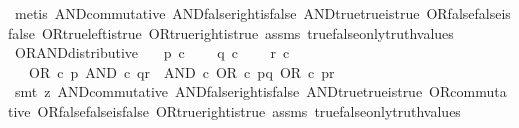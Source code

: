 \begin{isabellebody}
\ {\isacharparenleft}{\kern0pt}metis\ AND{\isacharunderscore}{\kern0pt}commutative\ AND{\isacharunderscore}{\kern0pt}false{\isacharunderscore}{\kern0pt}right{\isacharunderscore}{\kern0pt}is{\isacharunderscore}{\kern0pt}false\ AND{\isacharunderscore}{\kern0pt}true{\isacharunderscore}{\kern0pt}true{\isacharunderscore}{\kern0pt}is{\isacharunderscore}{\kern0pt}true\ OR{\isacharunderscore}{\kern0pt}false{\isacharunderscore}{\kern0pt}false{\isacharunderscore}{\kern0pt}is{\isacharunderscore}{\kern0pt}false\ OR{\isacharunderscore}{\kern0pt}true{\isacharunderscore}{\kern0pt}left{\isacharunderscore}{\kern0pt}is{\isacharunderscore}{\kern0pt}true\ OR{\isacharunderscore}{\kern0pt}true{\isacharunderscore}{\kern0pt}right{\isacharunderscore}{\kern0pt}is{\isacharunderscore}{\kern0pt}true\ assms\ true{\isacharunderscore}{\kern0pt}false{\isacharunderscore}{\kern0pt}only{\isacharunderscore}{\kern0pt}truth{\isacharunderscore}{\kern0pt}values{\isacharparenright}{\kern0pt}%
\endisatagproof
{\isafoldproof}%
%
\isadelimproof
\isanewline
%
\endisadelimproof
\isanewline
{}\isamarkupfalse%
\ OR{\isacharunderscore}{\kern0pt}AND{\isacharunderscore}{\kern0pt}distributive{\isacharcolon}{\kern0pt}\isanewline
\ \ \ {\isachardoublequoteopen}p\ {\isasymin}\isactrlsub c\ {\isasymOmega}{\isachardoublequoteclose}\isanewline
\ \ \ {\isachardoublequoteopen}q\ {\isasymin}\isactrlsub c\ {\isasymOmega}{\isachardoublequoteclose}\isanewline
\ \ \ {\isachardoublequoteopen}r\ {\isasymin}\isactrlsub c\ {\isasymOmega}{\isachardoublequoteclose}\isanewline
\ \ \ {\isachardoublequoteopen}OR\ {\isasymcirc}\isactrlsub c\ {\isasymlangle}p{\isacharcomma}{\kern0pt}\ AND\ {\isasymcirc}\isactrlsub c\ {\isasymlangle}q{\isacharcomma}{\kern0pt}r{\isasymrangle}{\isasymrangle}\ {\isacharequal}{\kern0pt}\ AND\ {\isasymcirc}\isactrlsub c\ {\isasymlangle}OR\ {\isasymcirc}\isactrlsub c\ {\isasymlangle}p{\isacharcomma}{\kern0pt}q{\isasymrangle}{\isacharcomma}{\kern0pt}\ OR\ {\isasymcirc}\isactrlsub c\ {\isasymlangle}p{\isacharcomma}{\kern0pt}r{\isasymrangle}{\isasymrangle}{\isachardoublequoteclose}\isanewline
%
\isadelimproof
\ \ %
\endisadelimproof
%
\isatagproof
{}\isamarkupfalse%
\ {\isacharparenleft}{\kern0pt}smt\ {\isacharparenleft}{\kern0pt}z{}{\isacharparenright}{\kern0pt}\ AND{\isacharunderscore}{\kern0pt}commutative\ AND{\isacharunderscore}{\kern0pt}false{\isacharunderscore}{\kern0pt}right{\isacharunderscore}{\kern0pt}is{\isacharunderscore}{\kern0pt}false\ AND{\isacharunderscore}{\kern0pt}true{\isacharunderscore}{\kern0pt}true{\isacharunderscore}{\kern0pt}is{\isacharunderscore}{\kern0pt}true\ OR{\isacharunderscore}{\kern0pt}commutative\ OR{\isacharunderscore}{\kern0pt}false{\isacharunderscore}{\kern0pt}false{\isacharunderscore}{\kern0pt}is{\isacharunderscore}{\kern0pt}false\ OR{\isacharunderscore}{\kern0pt}true{\isacharunderscore}{\kern0pt}right{\isacharunderscore}{\kern0pt}is{\isacharunderscore}{\kern0pt}true\ assms\ true{\isacharunderscore}{\kern0pt}false{\isacharunderscore}{\kern0pt}only{\isacharunderscore}{\kern0pt}truth{\isacharunderscore}{\kern0pt}values{\isacharparenright}{\kern0pt}%

\end{isabellebody}
